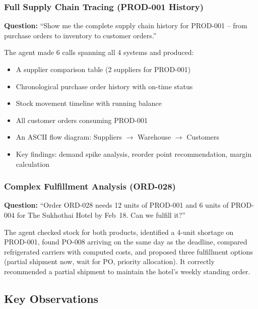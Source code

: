 \documentclass[11pt,a4paper]{article}
\begin{document}
\subsubsection{Full Supply Chain Tracing (PROD-001 History)}

\textbf{Question:} ``Show me the complete supply chain history for PROD-001 -- from purchase orders to inventory to customer orders.''

The agent made 6 calls spanning all 4 systems and produced:

\begin{itemize}[nosep]
    \item A supplier comparison table (2 suppliers for PROD-001)
    \item Chronological purchase order history with on-time status
    \item Stock movement timeline with running balance
    \item All customer orders consuming PROD-001
    \item An ASCII flow diagram: Suppliers $\to$ Warehouse $\to$ Customers
    \item Key findings: demand spike analysis, reorder point recommendation, margin calculation
\end{itemize}

\subsubsection{Complex Fulfillment Analysis (ORD-028)}

\textbf{Question:} ``Order ORD-028 needs 12 units of PROD-001 and 6 units of PROD-004 for The Sukhothai Hotel by Feb~18. Can we fulfill it?''

The agent checked stock for both products, identified a 4-unit shortage on PROD-001, found PO-008 arriving on the same day as the deadline, compared refrigerated carriers with computed costs, and proposed three fulfillment options (partial shipment now, wait for PO, priority allocation). It correctly recommended a partial shipment to maintain the hotel's weekly standing order.

\subsection{Key Observations}
\end{document}

